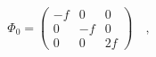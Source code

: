 \begin{equation}
\Phi_0=\left(\begin{array}{ccc}
-f&0&0\\ 0&-f&0\\ 0&0&2f
\end{array}\right)\quad,
\end{equation}

